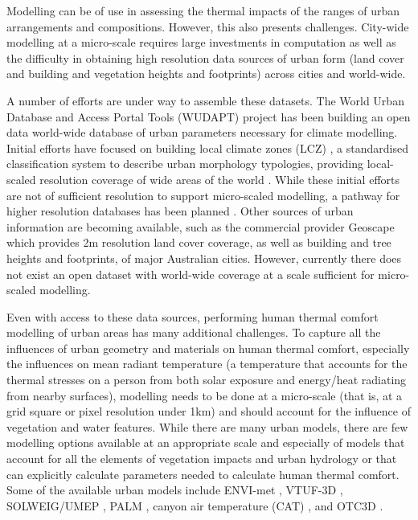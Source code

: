 \documentclass[final,3p,times,authoryear]{elsarticle}
\begin{document}
Modelling can be of use in assessing the thermal impacts of the ranges of urban arrangements and compositions. However, this also presents challenges. City-wide modelling at a micro-scale requires large investments in computation as well as the difficulty in obtaining high resolution data sources of urban form (land cover and building and vegetation heights and footprints) across cities and world-wide.

A number of efforts are under way to assemble these datasets. The World Urban Database and Access Portal Tools (WUDAPT) project \citep{Ching2018a} has been building an open data world-wide database of urban parameters necessary for climate modelling. Initial efforts have focused on building local climate zones (LCZ) \citep{Stewart2012b}, a standardised classification system to describe urban morphology typologies, providing local-scaled resolution coverage of wide areas of the world \citep{Demuzere2019}. While these initial efforts are not of sufficient resolution to support micro-scaled modelling, a pathway for higher resolution databases has been planned \citep{Ching2019}. Other sources of urban information are becoming available, such as the commercial provider Geoscape \citep{Geoscape2020} which provides 2m resolution land cover coverage, as well as building and tree heights and footprints, of major Australian cities. However, currently there does not exist an open dataset with world-wide coverage at a scale sufficient for micro-scaled modelling.

Even with access to these data sources, performing human thermal comfort modelling of urban areas has many additional challenges. To capture all the influences of urban geometry and materials on human thermal comfort, especially the influences on mean radiant temperature \citep{Kantor2011} (a temperature that accounts for the thermal stresses on a person from both solar exposure and energy/heat radiating from nearby surfaces), modelling needs to be done at a micro-scale (that is, at a grid square or pixel resolution under 1km) and should account for the influence of vegetation and water features. While there are many urban models, there are few modelling options available at an appropriate scale and especially of models that account for all the elements of vegetation impacts and urban hydrology or that can explicitly calculate parameters needed to calculate human thermal comfort. Some of the available urban models include ENVI-met \citep{Bruse1999}, VTUF-3D \citep{Nice2018a}, SOLWEIG/UMEP \citep{Lindberg2018}, PALM \citep{Dominik2019}, canyon air temperature (CAT) \citep{Erell2006}, and OTC3D \citep{Nazarian2018}. 
\end{document}
